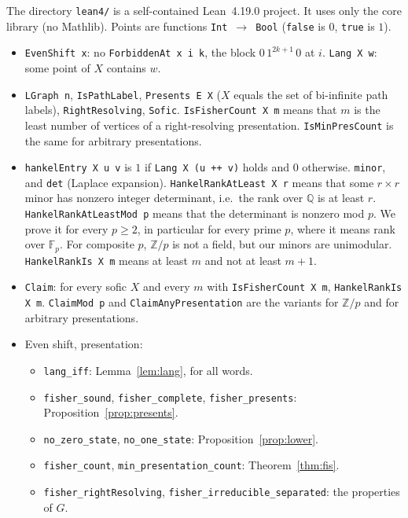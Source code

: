 \documentclass[11pt]{article}
\theoremstyle{definition}
\theoremstyle{remark}
\begin{document}
The directory \texttt{lean4/} is a self-contained Lean~4.19.0 project. It uses
only the core library (no Mathlib). Points are functions
\texttt{Int}~$\to$~\texttt{Bool} (\texttt{false} is $0$, \texttt{true} is $1$).
\begin{itemize}
\item \texttt{EvenShift x}: no \texttt{ForbiddenAt x i k}, the block
$0\,1^{2k+1}\,0$ at $i$. \texttt{Lang X w}: some point of $X$ contains $w$.
\item \texttt{LGraph n}, \texttt{IsPathLabel}, \texttt{Presents E X}
($X$ equals the set of bi-infinite path labels), \texttt{RightResolving},
\texttt{Sofic}. \texttt{IsFisherCount X m} means that $m$ is the least number
of vertices of a right-resolving presentation. \texttt{IsMinPresCount} is the
same for arbitrary presentations.
\item \texttt{hankelEntry X u v} is $1$ if \texttt{Lang X (u ++ v)} holds and
$0$ otherwise. \texttt{minor}, and \texttt{det} (Laplace expansion).
\texttt{HankelRankAtLeast X r} means that some $r\times r$ minor has nonzero
integer determinant, i.e.\ the rank over $\mathbb Q$ is at least $r$.
\texttt{HankelRankAtLeastMod p} means that the determinant is nonzero mod $p$.
We prove it for every $p\ge2$, in particular for every prime $p$, where it means
rank over $\mathbb F_p$. For composite $p$, $\mathbb Z/p$ is not a field, but our
minors are unimodular. \texttt{HankelRankIs X m} means at least $m$ and not at least $m+1$.
\item \texttt{Claim}: for every sofic $X$ and every $m$ with
\texttt{IsFisherCount X m}, \texttt{HankelRankIs X m}. \texttt{ClaimMod p} and
\texttt{ClaimAnyPresentation} are the variants for $\mathbb Z/p$ and for
arbitrary presentations.
\item Even shift, presentation:
  \begin{itemize}
  \item \texttt{lang\_iff}: Lemma~\ref{lem:lang}, for all words.
  \item \texttt{fisher\_sound}, \texttt{fisher\_complete}, \texttt{fisher\_presents}:
  Proposition~\ref{prop:presents}.
  \item \texttt{no\_zero\_state}, \texttt{no\_one\_state}: Proposition~\ref{prop:lower}.
  \item \texttt{fisher\_count}, \texttt{min\_presentation\_count}: Theorem~\ref{thm:fis}.
  \item \texttt{fisher\_rightResolving}, \texttt{fisher\_irreducible\_separated}:
  the properties of $G$.
  \end{itemize}

\end{itemize}
\end{document}
